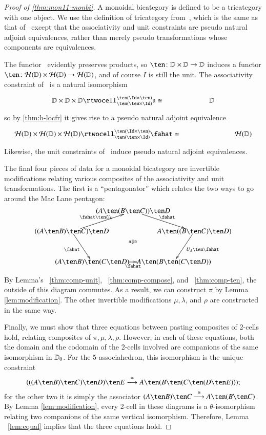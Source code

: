 \begin{proof}[Proof of \autoref{thm:mon11-monbi}]
  A monoidal bicategory is defined to be a tricategory with one
  object.  We use the definition of tricategory
  from~\cite{nick:tricats}, which is the same as that
  of~\cite{gps:tricats} except that the associativity and unit
  constraints are pseudo natural adjoint equivalences, rather than
  merely pseudo transformations whose components are equivalences.

  The functor \cH\ evidently preserves products, so $\ten\maps
  \lD\times\lD\to\lD$ induces a functor $\ten\maps
  \cH(\lD)\times\cH(\lD)\to \cH(\lD)$, and of course $I$ is still the
  unit.  The associativity constraint of \lD\ is a natural isomorphism
  \[\vcenter{\xymatrix@C=5pc{\lD\times\lD\times\lD \rtwocell^{\ten
        (\Id\times\ten)}_{\ten(\ten\times\Id)}{\fa\iso} &\lD }}\]
  so by \autoref{thm:h-locfr} it gives rise to a pseudo natural
  adjoint equivalence
  \[\vcenter{\xymatrix@C=6pc{\cH(\lD)\times\cH(\lD)\times\cH(\lD) \rtwocell^{\ten
        (\Id\times\ten)}_{\ten(\ten\times\Id)}{\fahat\eqv} &\cH(\lD) }}\]
  Likewise, the unit constraints of \lD\ induce pseudo natural adjoint
  equivalences.

  The final four pieces of data for a monoidal bicategory are
  invertible modifications relating various composites of the
  associativity and unit transformations.  The first is a
  ``pentagonator'' which relates the two ways to go around the Mac
  Lane pentagon:
  \[\xy
  (-10,0)*{((A\ten B)\ten C)\ten D}="A";
  (20,10)*{(A\ten (B\ten C))\ten D}="B";
  (50,0)*{A\ten ((B\ten C)\ten D)}="C";
  (0,-15)*{(A\ten B)\ten (C\ten D)}="D";
  (40,-15)*{A\ten (B\ten (C\ten D))}="E";
  (20,-5)*{\scriptstyle\pi\Downarrow\iso};
  \ar "B";"A";^{\fahat\ten U_D}
  \ar "C";"B";^{\fahat}
  \ar "D";"A";_{\fahat}
  \ar "E";"D";_{\fahat}
  \ar "E";"C";^{U_A\ten \fahat}
  \endxy
  \]
By Lemma's ~\ref{thm:comp-unit},  ~\ref{thm:comp-compose}, and ~\ref{thm:comp-ten}, the outside of this diagram commutes.  
 As a result, we can construct $\pi$ by Lemma \ref{lem:modification}. The other invertible modifications $\mu, \lambda$, and $\rho$ are constructed in the same way.

  Finally, we must show that three equations between pasting
  composites of 2-cells hold, relating composites of
  $\pi,\mu,\lambda,\rho$.  However, in each of these equations, both
  the domain and the codomain of the 2-cells involved are companions
  of the same isomorphism in $\mathbb{D}_0$.  For the 5-associahedron, this
  isomorphism is the unique constraint
  \[(((A\ten B)\ten C)\ten D)\ten E \too[\iso] A\ten (B\ten (C\ten
  (D\ten E)));
  \]
  for the other two it is simply the associator $(A\ten B)\ten C
  \too[\iso] A\ten (B\ten C)$.  By Lemma \ref{lem:modification},
  every 2-cell in these diagrams is a $\theta$-isomorphism relating
  two companions of the same vertical isomorphism.  Therefore, Lemma ~\ref{lem:equal} implies that the three equations hold.
\end{proof}


